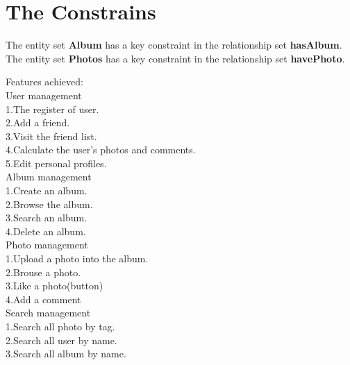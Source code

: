 \documentclass[11pt, oneside]{article}   	%
\begin{document}
\section{The Constrains}
The entity set \textbf{Album} has a key constraint in the relationship set \textbf{hasAlbum}.\\
The entity set \textbf{Photos} has a key constraint in the relationship set \textbf{havePhoto}.

Features achieved:\\[0.1cm]
User management\\
1.The register of user.\\
2.Add a friend.\\
3.Visit the friend list.\\
4.Calculate the user's photos and comments.\\
5.Edit personal profiles.\\[0.1cm]

Album management\\
1.Create an album.\\
2.Browse the album.\\
3.Search an album.\\
4.Delete an album.\\[0.1cm]

Photo management\\
1.Upload a photo into the album.\\
2.Brouse a photo.\\
3.Like a photo(button)\\
4.Add a comment\\


Search management\\
1.Search all photo by tag.\\
2.Search all user by name.\\
3.Search all album by name.\\
\end{document}
